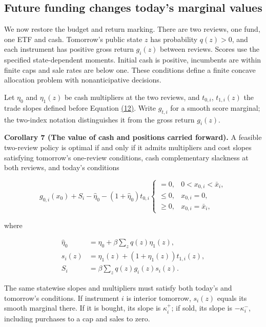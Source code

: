 \documentclass[11pt]{article}
\begin{document}
\subsection{Future funding changes today's marginal values}\label{sec:4.3}

We now restore the budget and return marking. There are two reviews, one fund, one ETF and cash. Tomorrow's public state \(z\) has probability \(q(z)>0\), and each instrument has positive gross return \(g_i(z)\) between reviews. Scores use the specified state-dependent moments. Initial cash is positive, incumbents are within finite caps and sale rates are below one. These conditions define a finite concave allocation problem with nonanticipative decisions.

Let \(\eta_0\) and \(\eta_1(z)\) be cash multipliers at the two reviews, and \(t_{0,i}\), \(t_{1,i}(z)\) the trade slopes defined before Equation \hyperref[eq:12]{(12)}. Write \(g_{t,i}\) for a smooth score marginal; the two-index notation distinguishes it from the gross return \(g_i(z)\).

\label{res:Corollary-7}
\textbf{Corollary 7 (The value of cash and positions carried forward).} A feasible two-review policy is optimal if and only if it admits multipliers and cost slopes satisfying tomorrow's one-review conditions, cash complementary slackness at both reviews, and today's conditions

\begin{equation*}
g_{0,i}(x_0)+S_i-\hat\eta_0-(1+\hat\eta_0)t_{0,i}
\begin{cases}
=0,&0<x_{0,i}<\bar x_i,\\
\leq0,&x_{0,i}=0,\\
\geq0,&x_{0,i}=\bar x_i,
\end{cases}
\tag{23}\label{eq:23}
\end{equation*}

where

\begin{equation*}
\begin{aligned}
\hat\eta_0&=\eta_0+\beta\sum_z q(z)\eta_1(z),\\
s_i(z)&=\eta_1(z)+(1+\eta_1(z))t_{1,i}(z),\\
S_i&=\beta\sum_z q(z)g_i(z)s_i(z).
\end{aligned}
\tag{24}\label{eq:24}
\end{equation*}

The same statewise slopes and multipliers must satisfy both today's and tomorrow's conditions. If instrument \(i\) is interior tomorrow, \(s_i(z)\) equals its smooth marginal there. If it is bought, its slope is \(\kappa_i^+\); if sold, its slope is \(-\kappa_i^-\), including purchases to a cap and sales to zero.
\end{document}
